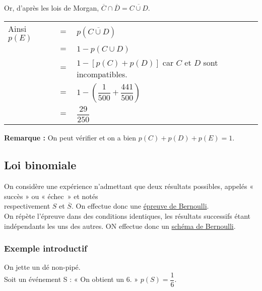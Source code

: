 \begin{itemize}
Or, d'après les lois de Morgan, $\overline{C} \cap \overline{D} = \overline{C \cup D}$. \\

\begin{tabular}{lll}
\hspace*{-.3cm} Ainsi $p\left(E\right)$ & $=$ & $p\left(\overline{C \cup D}\right)$ \\
& $=$ & $1 - p\left(C \cup D\right)$ \\
& $=$ & $1 - \left[p\left(C\right) + p\left(D\right)\right]$ car $C$ et $D$ sont incompatibles. \\
& $=$ & $1 - \left(\dfrac{1}{500} + \dfrac{441}{500}\right)$ \\
& $=$ & $\dfrac{29}{250}$ \\
\end{tabular}

\vspace*{.3cm}

\textbf{Remarque :} On peut vérifier et on a bien $p\left(C\right) + p\left(D\right) + p\left(E\right) = 1$.

\vspace*{-50cm}
\end{itemize}

\vspace*{-50cm}

\newpage 

\vspace*{-2cm}

\subsection{Loi binomiale}

On considère une expérience n'admettant que deux résultats possibles, appelés « succès » ou « échec~» et notés \\ respectivement $S$ et $\overline{S} $. On effectue donc une \underline{épreuve de Bernoulli}. \\

On répète l'épreuve dans des conditions identiques, les résultats successifs étant indépendants les uns des autres. ON effectue donc un \underline{schéma de Bernoulli}.

\subsubsection{Exemple introductif}

On jette un dé non-pipé. \\ Soit un événement S : « On obtient un 6. » $p\left(S\right) = \dfrac{1}{6} $. \\

